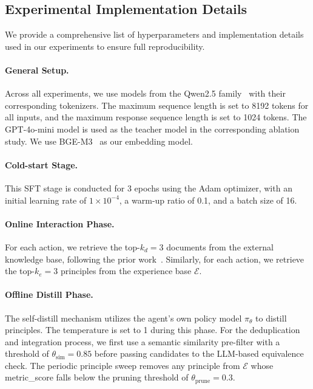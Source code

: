 \subsection{Experimental Implementation Details}
\label{appendix:setups}
We provide a comprehensive list of hyperparameters and implementation details used in our experiments to ensure full reproducibility.

\paragraph{General Setup.}
Across all experiments, we use models from the Qwen2.5 family~\citep{qwen2025qwen25technicalreport} with their corresponding tokenizers. The maximum sequence length is set to 8192 tokens for all inputs, and the maximum response sequence length is set to 1024 tokens. The GPT-4o-mini model is used as the teacher model in the corresponding ablation study. We use BGE-M3~\citep{chen2024bge} as our embedding model.

\paragraph{Cold-start Stage.}
This SFT stage is conducted for 3 epochs using the Adam optimizer, with an initial learning rate of $1\times10^{-4}$, a warm-up ratio of 0.1, and a batch size of 16.

\paragraph{Online Interaction Phase.}
For each  action, we retrieve the top-$k_d=3$ documents from the external knowledge base, following the prior work~\citep{jin2025searchr1trainingllmsreason}. Similarly, for each  action, we retrieve the top-$k_e=3$ principles from the experience base $\mathcal{E}$.

\paragraph{Offline Distill Phase.}
The self-distill mechanism utilizes the agent's own policy model $\pi_\theta$ to distill principles. The temperature is set to 1 during this phase. For the deduplication and integration process, we first use a semantic similarity pre-filter with a threshold of $\theta_{\text{sim}} = 0.85$ before passing candidates to the LLM-based equivalence check. The periodic principle sweep removes any principle from $\mathcal{E}$ whose metric\_score falls below the pruning threshold of $\theta_{\text{prune}} = 0.3$.

